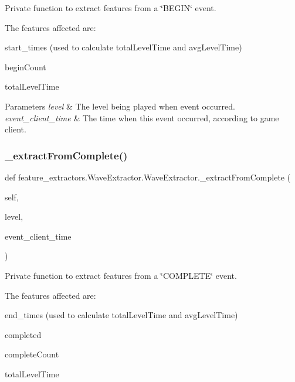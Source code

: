 Private function to extract features from a \char`\"{}\+B\+E\+G\+I\+N\char`\"{} event. 

The features affected are\+:
\begin{DoxyItemize}
\item start\+\_\+times (used to calculate total\+Level\+Time and avg\+Level\+Time)
\item begin\+Count
\item total\+Level\+Time
\end{DoxyItemize}


\begin{DoxyParams}{Parameters}
{\em level} & The level being played when event occurred. \\
\hline
{\em event\+\_\+client\+\_\+time} & The time when this event occurred, according to game client. \\
\hline
\end{DoxyParams}
\mbox{\label{classfeature__extractors_1_1_wave_extractor_1_1_wave_extractor_a1d30be62a12e61203e415f6cb2303863}} 
\subsubsection{\texorpdfstring{\_extractFromComplete()}{\_extractFromComplete()}}
{\footnotesize\ttfamily def feature\+\_\+extractors.\+Wave\+Extractor.\+Wave\+Extractor.\+\_\+extract\+From\+Complete (\begin{DoxyParamCaption}\item[{}]{self,  }\item[{}]{level,  }\item[{}]{event\+\_\+client\+\_\+time }\end{DoxyParamCaption})\hspace{0.3cm}{\ttfamily [private]}}



Private function to extract features from a \char`\"{}\+C\+O\+M\+P\+L\+E\+T\+E\char`\"{} event. 

The features affected are\+:
\begin{DoxyItemize}
\item end\+\_\+times (used to calculate total\+Level\+Time and avg\+Level\+Time)
\item completed
\item complete\+Count
\item total\+Level\+Time
\end{DoxyItemize}


